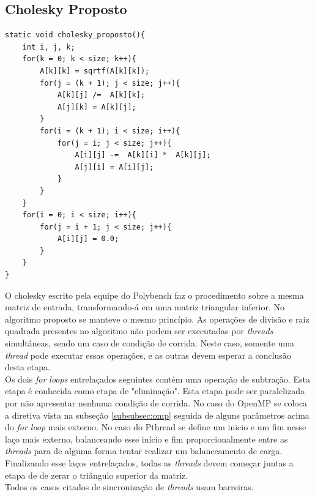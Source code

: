 \documentclass[12pt]{article}
\newcommand\tab[1][1cm]{\hspace*{#1}}
\begin{document}
\subsection{Cholesky Proposto}\label{subsec:cholprop}
\begin{lstlisting}[style=CStyle]
static void cholesky_proposto(){
    int i, j, k;
    for(k = 0; k < size; k++){
        A[k][k] = sqrtf(A[k][k]);
        for(j = (k + 1); j < size; j++){
            A[k][j] /=  A[k][k];
            A[j][k] = A[k][j];
        }
        for(i = (k + 1); i < size; i++){
            for(j = i; j < size; j++){
                A[i][j] -=  A[k][i] *  A[k][j];
                A[j][i] = A[i][j];
            }
        }
    }
    for(i = 0; i < size; i++){
        for(j = i + 1; j < size; j++){
            A[i][j] = 0.0;
        }
    }
}
\end{lstlisting}
\tab O cholesky escrito pela equipe do Polybench faz o procedimento sobre a mesma matriz de entrada, transformando-á em  uma matriz triangular inferior.  No algoritmo proposto se manteve  o mesmo princípio. As operações de divisão e raiz quadrada presentes no algoritmo não podem ser executadas por \textit{threads} simultâneas, sendo um caso de condição de corrida. Neste caso, somente uma  \textit{thread} pode executar  essas operações, e as outras devem esperar a conclusão desta etapa.
\\
\tab Os dois \textit{for loops} entrelaçados seguintes contém uma operação de subtração. Esta etapa é conhecida como etapa de "eliminação". Esta etapa pode ser paralelizada por não apresentar nenhuma condição de corrida. No caso do OpenMP se coloca a diretiva vista na subseção \ref{subsubsec:omp} seguida de alguns parâmetros acima do \textit{for loop} mais externo. No caso do Pthread se define um inicio e um fim nesse laço mais externo, balanceando esse início e fim proporcionalmente entre as \textit{threads} para de alguma forma tentar realizar um balanceamento de carga. Finalizando esse laços entrelaçados,  todas as \textit{threads} devem  começar juntas a etapa de de zerar o triângulo superior da matriz.
\\
\tab Todos os casos citados de sincronização de \textit{threads} usam barreiras.
\end{document}
